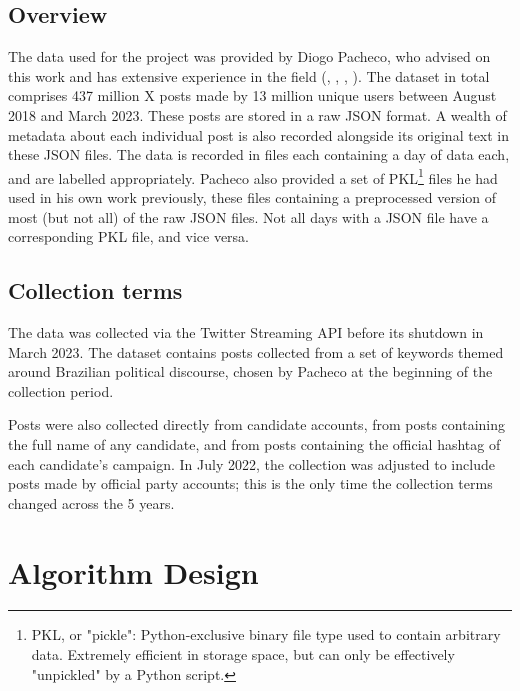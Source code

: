 \documentclass[a4paper,11pt]{article}  %
\begin{document}
	\subsection{Overview}
	\label{subsec:overview}
	The data used for the project was provided by Diogo Pacheco, who advised on this work and has extensive experience in the field (\textcite{pachecoBotsElectionsControversies2023}, \textcite{pachecoUncoveringCoordinatedNetworks2021}, \textcite{chenNeutralBotsProbe2021},
	\textcite{pachecoUnveilingCoordinatedGroups2020}). The dataset in total comprises 437 million X posts made by 13 million unique users between August 2018 and March 2023. These posts are stored in a raw JSON format. A wealth of metadata about each individual post is also recorded alongside its original text in these JSON files. The data is recorded in files each containing a day of data each, and are labelled appropriately. 
	Pacheco also provided a set of PKL\footnote{PKL, or "pickle": Python-exclusive binary file type used to contain arbitrary data. Extremely efficient in storage space, but can only be effectively "unpickled" by a Python script.} files he had used in his own work previously, these files containing a preprocessed version of most (but not all) of the raw JSON files. Not all days with a JSON file have a corresponding PKL file, and vice versa.
	\subsection{Collection terms}
	\label{subsec:terms}
	The data was collected via the Twitter Streaming API before its shutdown in March 2023. The dataset contains posts collected from a set of keywords themed around Brazilian political discourse, chosen by Pacheco at the beginning of the collection period.
	
	Posts were also collected directly from candidate accounts, from posts containing the full name of any candidate, and from posts containing the official hashtag of each candidate's campaign. In July 2022, the collection was adjusted to include posts made by official party accounts; this is the only time the collection terms changed across the 5 years.
	
	\section{Algorithm Design}
	\label{sec:design}
\end{document}
